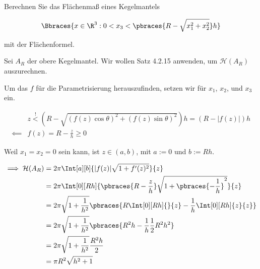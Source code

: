 
\begin{exercise}

Berechnen Sie das Flächenmaß eines Kegelmantels

\begin{align*}
    \Bbraces
    {
        x \in \R^3:
        0 < x_3 < \pbraces{R - \sqrt{x_1^2 + x_2^2}} h
    }
\end{align*}

mit der Flächenformel.

\end{exercise}


\begin{solution}

Sei $A_R$ der obere Kegelmantel.
Wir wollen Satz 4.2.15 anwenden, um $\mathcal{H}(A_R)$ auszurechnen.


Um das $f$ für die Parametrisierung herauszufinden, setzen wir für $x_1$, $x_2$, und $x_3$ ein.

\begin{align*}
    &
    z
    \stackrel{!}{<}
    (R - \sqrt{(f(z) \cos \theta)^2 + (f(z) \sin \theta)^2}) h
    =
    (R - |f(z)|) h \\
    \impliedby &
    f(z) = R - \frac{z}{h} \geq 0
\end{align*}

Weil $x_1 = x_2 = 0$ sein kann, ist $z \in (a, b)$, mit $a := 0$ und $b := R h$.

\begin{align*}
    \implies
    \mathcal{H}(A_R)
    & =
    2 \pi
    \Int[a][b]
    {
        |f(z)| \sqrt{1 + f^\prime(z)^2}
    }{z} \\
    & =
    2 \pi
    \Int[0][R h]
    {
        \pbraces{R - \frac{z}{h}}
        \sqrt{1 + \pbraces{-\frac{1}{h}}^2}
    }{z} \\
    & =
    2 \pi \sqrt{1 + \frac{1}{h^2}}
    \pbraces
    {
        R
        \Int[0][R h]{}{z}
        -
        \frac{1}{h}
        \Int[0][R h]{z}{z}
    } \\
    & =
    2 \pi \sqrt{1 + \frac{1}{h^2}}
    \pbraces{R^2 h - \frac{1}{h} \frac{1}{2} R^2 h^2} \\
    & =
    2 \pi \sqrt{1 + \frac{1}{h^2}}
    \frac{R^2 h}{2} \\
    & =
    \pi R^2 \sqrt{h^2 + 1}
\end{align*}

\end{solution}


